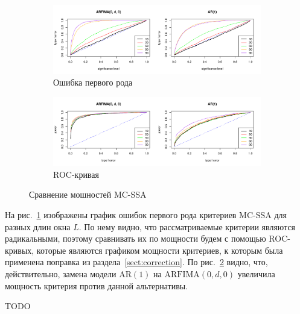 \documentclass[specialist,
substylefile = spbu_report.rtx,
subf,href,colorlinks=true, 12pt]{disser}
\theoremstyle{definition}
\begin{document}
\begin{figure}[h!]
	\begin{subfigure}{\textwidth}
		\includegraphics[width=\textwidth]{img/alphaI_comp.pdf}
		\caption{Ошибка первого рода}
		\label{fig:ar1_vs_fi_alphaI}
	\end{subfigure}
	\begin{subfigure}{\textwidth}
		\includegraphics[width=\textwidth]{img/roc_comp.pdf}
		\caption{ROC-кривая}
		\label{fig:ar1_vs_fi_roc}
	\end{subfigure}
	\caption{Сравнение мошностей MC-SSA}
	\label{fig:ar1_vs_fi}
\end{figure}
На рис.~\ref{fig:ar1_vs_fi_alphaI} изображены график ошибок первого рода критериев MC-SSA для разных длин окна $L$. По нему видно, что рассматриваемые критерии являются радикальными, поэтому сравнивать их по мощности будем с помощью ROC-кривых, которые являются графиком мощности критериев, к которым была применена поправка из раздела~\ref{sect:correction}. По рис.~\ref{fig:ar1_vs_fi_roc} видно, что, действительно, замена модели $\mathrm{AR}(1)$ на $\mathrm{ARFIMA}(0, d, 0)$ увеличила мощность критерия против данной альтернативы.

\conclusion
TODO



\end{document}
